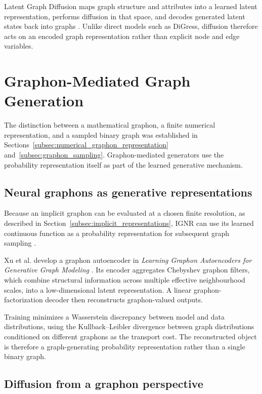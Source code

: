 Latent Graph Diffusion maps graph structure and attributes into a learned latent representation, performs diffusion in that space, and decodes generated latent states back into graphs \cite{zhou2024latent}. Unlike direct models such as DiGress, diffusion therefore acts on an encoded graph representation rather than explicit node and edge variables.


\section{Graphon-Mediated Graph Generation}
\label{sec:rw_graphon_generation}

The distinction between a mathematical graphon, a finite numerical representation, and a sampled binary graph was established in Sections~\ref{subsec:numerical_graphon_representation} and~\ref{subsec:graphon_sampling}. Graphon-mediated generators use the probability representation itself as part of the learned generative mechanism.


\subsection{Neural graphons as generative representations}
\label{subsec:rw_neural_graphon_generation}

Because an implicit graphon can be evaluated at a chosen finite resolution, as described in Section~\ref{subsec:implicit_representations}, IGNR can use its learned continuous function as a probability representation for subsequent graph sampling \cite{xia2023implicit}.

Xu et al. develop a graphon autoencoder in \emph{Learning Graphon Autoencoders for Generative Graph Modeling} \cite{xu2021graphonautoencoder}. Its encoder aggregates Chebyshev graphon filters, which combine structural information across multiple effective neighbourhood scales, into a low-dimensional latent representation. A linear graphon-factorization decoder then reconstructs graphon-valued outputs.

Training minimizes a Wasserstein discrepancy between model and data distributions, using the Kullback--Leibler divergence between graph distributions conditioned on different graphons as the transport cost. The reconstructed object is therefore a graph-generating probability representation rather than a single binary graph.


\subsection{Diffusion from a graphon perspective}
\label{subsec:rw_graphon_diffusion}

